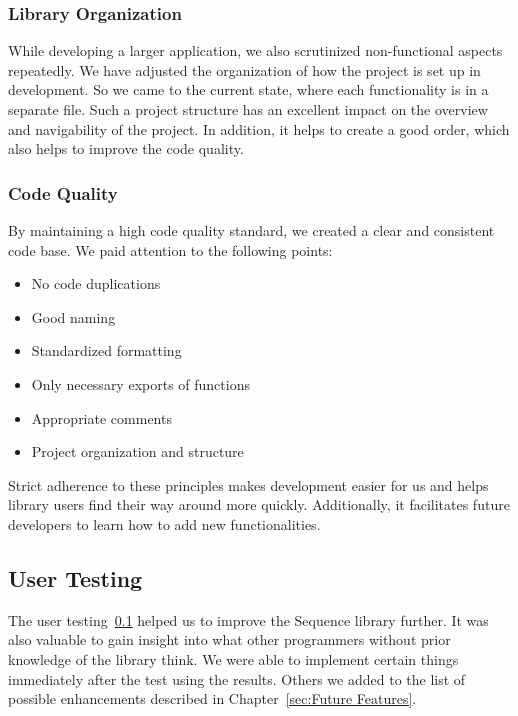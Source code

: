 \subsubsection{Library Organization}
\label{subsub:Library Organisation}
While developing a larger application, we also scrutinized non-functional
aspects repeatedly. We have adjusted the organization of how the project is set up
in development. So we came to the current state, where each
functionality is in a separate file. Such a project structure has an excellent
impact on the overview and navigability of the project. In addition, it helps
to create a good order, which also helps to improve the code quality.

\subsubsection{Code Quality}
\label{subsub:Code Quality}
By maintaining a high code quality standard, we created a clear and consistent
code base. We paid attention to the following points:

\begin{itemize}
  \item{No code duplications}
  \item{Good naming}
  \item{Standardized formatting}
  \item{Only necessary exports of functions}
  \item{Appropriate comments}
  \item{Project organization and structure}
\end{itemize}

Strict adherence to these principles makes development easier for us and helps
library users find their way around more quickly. Additionally, it facilitates
future developers to learn how to add new functionalities.

\subsection{User Testing}
\label{sub:User Testing}
The user testing~\ref{sub:User Testing} helped us to improve the Sequence library further. It was also
valuable to gain insight into what other programmers without prior knowledge of
the library think. We were able to implement certain things immediately after
the test using the results. Others we added to the list of possible enhancements described in
Chapter~\ref{sec:Future Features}.
